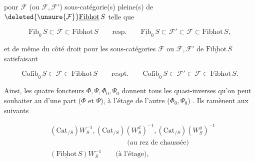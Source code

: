 

pour $\mathcal{F}$ (ou $\mathcal{F},\mathcal{F}'$) sous-catégorie(s) pleine(s) de $\deleted{\unsure{\mathcal{F}}}\underline{\mathrm{Fibhot}}\,S$ telle que

\[
\underline{\mathrm{Fib}}_0\,S\subset\mathcal{F}\subset\underline{\mathrm{Fibhot}}\,S
\qquad\text{resp.}\qquad
\underline{\mathrm{Fib}}_0\,S\subset\mathcal{F}'\subset\mathcal{F}\subset\underline{\mathrm{Fibhot}}\,S,
\]

et de même du côté droit pour les sous-catégories  $\mathcal{F}$ ou $\mathcal{F},\mathcal{F}'$ de $\underline{\mathrm{Fibhot}}\,S$ satisfaisant

\[
\underline{\mathrm{Cofib}}_0\,S\subset\mathcal F\subset\underline{\mathrm{Fibhot}}\,S
\qquad\text{respt.}\qquad
\underline{\mathrm{Cofib}}_0\,S\subset\mathcal F'\subset\mathcal F\subset\underline{\mathrm{Fibhot}}\,S.
\]


Ainsi, les quatre foncteurs $\Phi,\Psi,\Phi_0,\Psi_0$ donnent tous les quasi-inverses qu'on peut souhaiter au   d'une part ($\Phi$ et $\Psi$), à l'étage de l'autre ($\Phi_0,\Psi_0$) . Ils ramènent  aux   suivants

\[
\begin{aligned}
&(\mathrm{Cat}_{/S})W_S^{-1},(\mathrm{Cat}_{/S})(W_S^d)^{-1},(\mathrm{Cat}_{/S})(W_S^g)^{-1}\\
&\hspace{11em}\text{(au rez de chaussée)}\\
&(\underline{\mathrm{Fibhot}}\,S)W_S^{-1}\qquad\text{(à l'étage),}
\end{aligned}
\]

